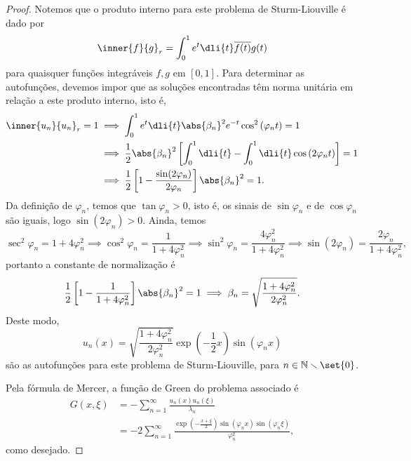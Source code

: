 \begin{proof}
    Notemos que o produto interno para este problema de Sturm-Liouville é dado por
    \begin{equation*}
        \inner{f}{g}_r = \int_{0}^{1} e^{t}\dli{t}\overline{f(t)}g(t)
    \end{equation*}
    para quaisquer funções integráveis \(f, g\) em \([0,1]\). Para determinar as autofunções, devemos impor que as soluções encontradas têm norma unitária em relação a este produto interno, isto é,
    \begin{align*}
        \inner{u_n}{u_n}_r = 1 &\implies \int_0^1 e^t \dli{t} \abs{\beta_n}^2 e^{-t}\cos^2\left(\varphi_n t\right) = 1\\
                               &\implies  \frac12\abs{\beta_n}^2 \left[\int_0^1 \dli{t} - \int_0^1 \dli{t} \cos\left(2\varphi_n t\right)\right] = 1\\
                               &\implies \frac12 \left[1 - \frac{\sin(2\varphi_n)}{2\varphi_n}\right]\abs{\beta_n}^2 = 1.
    \end{align*}
    Da definição de \(\varphi_n\), temos que \(\tan\varphi_n > 0\), isto é, os sinais de \(\sin\varphi_n\) e de \(\cos\varphi_n\) são iguais, logo \(\sin(2\varphi_n) > 0\). Ainda, temos
    \begin{equation*}
        \sec^2\varphi_n = 1 + 4\varphi_n^2 \implies \cos^2\varphi_n = \frac{1}{1+4\varphi_n^2} \implies \sin^2\varphi_n = \frac{4\varphi_n^2}{1+4\varphi_n^2} \implies \sin(2\varphi_n) = \frac{2\varphi_n}{1+4\varphi_n^2},
    \end{equation*}
    portanto a constante de normalização é
    \begin{equation*}
        \frac12\left[1 - \frac{1}{1+4\varphi_n^2}\right]\abs{\beta_n}^2 = 1 \implies \beta_n = \sqrt{\frac{1+4\varphi_n^2}{2\varphi_n^2}}.
    \end{equation*}
    Deste modo,
    \begin{equation*}
        u_n(x) = \sqrt{\frac{1 + 4\varphi_n^2}{2\varphi_n^2}}\exp\left(-\frac{1}{2}x\right)\sin\left(\varphi_n x\right)
    \end{equation*}
    são as autofunções para este problema de Sturm-Liouville, para \(n \in \mathbb{N}\smallsetminus\set{0}\).

    Pela fórmula de Mercer, a função de Green do problema associado é
    \begin{align*}
        G(x,\xi) &= -\sum_{n = 1}^\infty \frac{u_n(x)u_n(\xi)}{\lambda_n}\\
                 &= - 2\sum_{n = 1}^\infty \frac{\exp\left(-\frac{x + \xi}{2}\right)\sin\left(\varphi_n x\right)\sin\left(\varphi_n \xi\right)}{\varphi_n^2},
    \end{align*}
    como desejado.
\end{proof}
